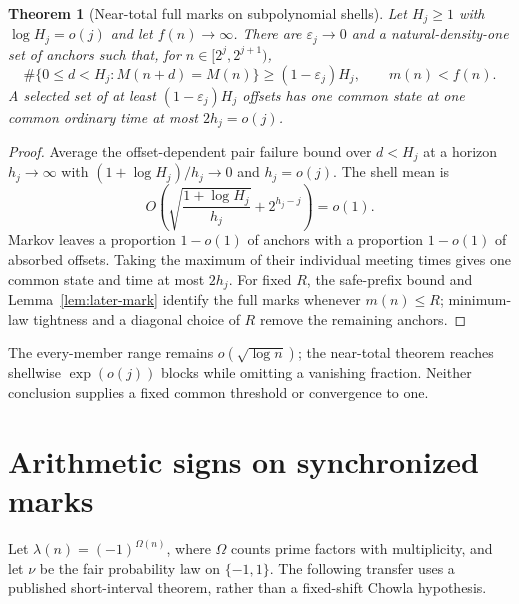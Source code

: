 \documentclass[11pt]{amsart}
\newtheorem{theorem}{Theorem}[section]
\theoremstyle{definition}
\theoremstyle{remark}
\begin{document}
\begin{theorem}[Near-total full marks on subpolynomial shells]\label{thm:natural-majority}
Let $H_j\ge1$ with $\log H_j=o(j)$ and let $f(n)\to\infty$. There are $\varepsilon_j\to0$ and a natural-density-one set of anchors such that, for $n\in[2^j,2^{j+1})$,
\[
 \#\{0\le d<H_j:M(n+d)=M(n)\}\ge(1-\varepsilon_j)H_j,
 \qquad m(n)<f(n).
\]
A selected set of at least $(1-\varepsilon_j)H_j$ offsets has one common state at one common ordinary time at most $2h_j=o(j)$.
\end{theorem}
\begin{proof}
Average the offset-dependent pair failure bound over $d<H_j$ at a horizon $h_j\to\infty$ with $(1+\log H_j)/h_j\to0$ and $h_j=o(j)$. The shell mean is
\[
 O\!\left(\sqrt{\frac{1+\log H_j}{h_j}}+2^{h_j-j}\right)=o(1).
\]
Markov leaves a proportion $1-o(1)$ of anchors with a proportion $1-o(1)$ of absorbed offsets. Taking the maximum of their individual meeting times gives one common state and time at most $2h_j$. For fixed $R$, the safe-prefix bound and Lemma~\ref{lem:later-mark} identify the full marks whenever $m(n)\le R$; minimum-law tightness and a diagonal choice of $R$ remove the remaining anchors.
\end{proof}
The every-member range remains $o(\sqrt{\log n})$; the near-total theorem reaches shellwise $\exp(o(j))$ blocks while omitting a vanishing fraction. Neither conclusion supplies a fixed common threshold or convergence to one.

\section{Arithmetic signs on synchronized marks}\label{sec:arithmetic-signs}
Let $\lambda(n)=(-1)^{\Omega(n)}$, where $\Omega$ counts prime factors with multiplicity, and let $\nu$ be the fair probability law on $\{-1,1\}$. The following transfer uses a published short-interval theorem, rather than a fixed-shift Chowla hypothesis.
\end{document}
